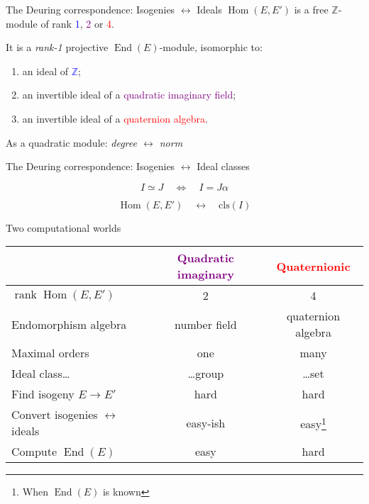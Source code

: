 \documentclass[aspectratio=169]{beamer}
\newcommand{\End}{\operatorname{End}}
\newcommand{\Hom}{\operatorname{Hom}}
\DeclareMathOperator{\rank}{rank}
\begin{document}

\begin{frame}{The Deuring correspondence: Isogenies $\longleftrightarrow$ Ideals}
  \large $\Hom(E,E')$ is a free $ℤ$-module of rank
  \textcolor{blue}{1}, \textcolor{purple}{2} or \textcolor{red}{4}.

  \bigskip
  It is a \emph{rank-1} projective $\End(E)$-module, isomorphic to:

  \bigskip
  \begin{enumerate}
    \setlength{\itemsep}{1em}
  \item[\color{blue}1)] an ideal of \textcolor{blue}{$ℤ$};
  \item[\color{purple}2)] an invertible ideal of a
    \textcolor{purple}{quadratic imaginary field};
  \item[\color{red}4)] an invertible ideal of a
    \textcolor{red}{quaternion algebra}.
  \end{enumerate}

  \bigskip
  As a quadratic module: \emph{degree $\longleftrightarrow$ norm}
\end{frame}


\begin{frame}{The Deuring correspondence: Isogenies $\longleftrightarrow$ Ideal classes}
  \Large
  \begin{description}
    \setlength{\itemsep}{2em}
  \item[Equivalent ideals:]
    \[I ≃ J  \quad\Longleftrightarrow\quad I = Jα\]
  \item[Deuring correspondence:]
    \[\Hom(E,E') \quad\longleftrightarrow\quad \mathrm{cls}(I)\]
  \end{description}
\end{frame}


\begin{frame}{Two computational worlds}
  \centering
  \setlength{\tabcolsep}{2em}
  \renewcommand{\arraystretch}{1.5}
  \begin{tabular}{p{} c c}
    & \textcolor{purple}{Quadratic imaginary} & \textcolor{red}{Quaternionic}\\
    \hline
    $\rank\Hom(E,E')$ & 2 & 4\\
    Endomorphism algebra & number field & quaternion algebra\\
    Maximal orders & one & many \\
    Ideal class\dots & \dots group & \dots set\\
    Find isogeny $E → E'$ & \alert{hard} & \alert{hard}\\
    Convert isogenies $\leftrightarrow$ ideals & easy-ish\footnotemark[1] & easy\footnote[1]{When $\End(E)$ is known}\\
    Compute $\End(E)$ & easy & \alert{hard}\\
  \end{tabular}
\end{frame}
\end{document}
